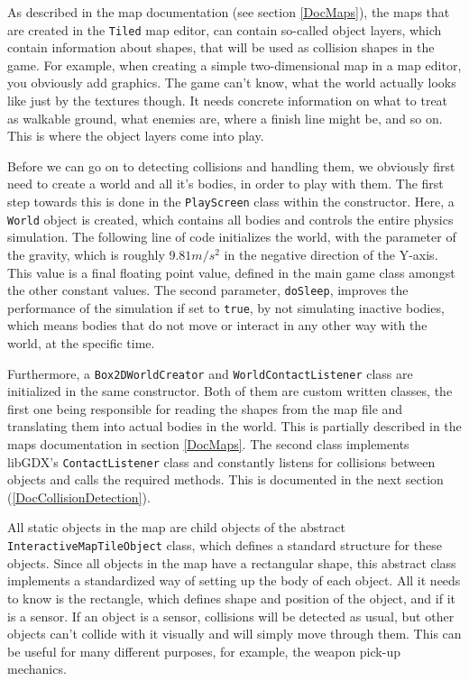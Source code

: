 \documentclass[12p]{article}
\begin{document}
As described in the map documentation (see section \ref{DocMaps}), the maps that are created in the \texttt{Tiled} map editor, can contain so-called object layers, which contain information about shapes, that will be used as collision shapes in the game. For example, when creating a simple two-dimensional map in a map editor, you obviously add graphics. The game can't know, what the world actually looks like just by the textures though. It needs concrete information on what to treat as walkable ground, what enemies are, where a finish line might be, and so on. This is where the object layers come into play.

Before we can go on to detecting collisions and handling them, we obviously first need to create a world and all it's bodies, in order to play with them. The first step towards this is done in the \texttt{PlayScreen} class within the constructor. Here, a \texttt{World} object is created, which contains all bodies and controls the entire physics simulation. The following line of code initializes the world, with the parameter of the gravity, which is roughly $9.81m/s^2$ in the negative direction of the Y-axis. This value is a final floating point value, defined in the main game class amongst the other constant values. The second parameter, \texttt{doSleep}, improves the performance of the simulation if set to \texttt{true}, by not simulating inactive bodies, which means bodies that do not move or interact in any other way with the world, at the specific time.


Furthermore, a \texttt{Box2DWorldCreator} and \texttt{WorldContactListener} class are initialized in the same constructor. Both of them are custom written classes, the first one being responsible for reading the shapes from the map file and translating them into actual bodies in the world. This is partially described in the maps documentation in section \ref{DocMaps}. The second class implements libGDX's \texttt{ContactListener} class and constantly listens for collisions between objects and calls the required methods. This is documented in the next section (\ref{DocCollisionDetection}).

All static objects in the map are child objects of the abstract \texttt{InteractiveMapTileObject} class, which defines a standard structure for these objects. Since all objects in the map have a rectangular shape, this abstract class implements a standardized way of setting up the body of each object. All it needs to know is the rectangle, which defines shape and position of the object, and if it is a sensor. If an object is a sensor, collisions will be detected as usual, but other objects can't collide with it visually and will simply move through them. This can be useful for many different purposes, for example, the weapon pick-up mechanics.
\end{document}
